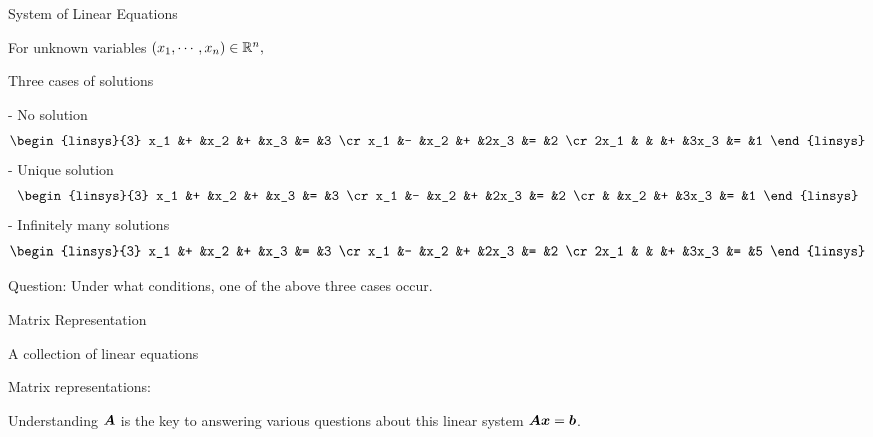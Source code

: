 \documentclass[fleqn,aspectratio=169]{beamer}
\begin{document}
\begin{frame}{System of Linear Equations}

\plitemsep 0.1in


\bci 
\item For unknown variables $(x_1, \cdots, x_n) \in {\mathbb R}^n,$

\item Three cases of solutions

{
- No solution
$$
\begin{linsys}{3}
x_1 &+ &x_2 &+ &x_3 &= &3 \cr
x_1 &- &x_2 &+ &2x_3 &= &2 \cr
2x_1 & & &+ &3x_3 &= &1 
\end{linsys}
$$
}
{
- Unique solution
$$
\begin{linsys}{3}
x_1 &+ &x_2 &+ &x_3 &= &3 \cr
x_1 &- &x_2 &+ &2x_3 &= &2 \cr
 & &x_2 &+ &3x_3 &= &1 
\end{linsys}
$$
}
{
- Infinitely many solutions 
$$
\begin{linsys}{3}
x_1 &+ &x_2 &+ &x_3 &= &3 \cr
x_1 &- &x_2 &+ &2x_3 &= &2 \cr
2x_1 & & &+ &3x_3 &= &5 
\end{linsys}
$$
}
\item Question: Under what conditions, one of the above three cases occur.
\eci
\end{frame}

\begin{frame}{Matrix Representation}

\plitemsep 0.1in

\bci 
\item A collection of linear equations

\item Matrix representations: 
\item Understanding $\bm{A}$ is the key to answering various questions about this linear system $\bm{A}\bm{x} = \bm{b}$.

\eci
\end{frame}
\end{document}
